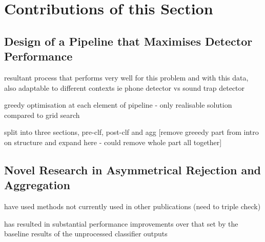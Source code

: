 \section{Contributions of this Section}
\label{sec:exp-overview}

    
    \subsection{Design of a Pipeline that Maximises Detector Performance}
    \label{subsec:exp-overview-detect}
        \begin{sitemize}
            \item{resultant process that performs very well for this problem and with this data, also adaptable to different contexts ie phone detector vs sound trap detector}
            \item{greedy optimisation at each element of pipeline - only realisable solution compared to grid search}
            \item{split into three sections, pre-clf, post-clf and agg [remove greeedy part from intro on structure and expand here - could remove whole part all together]}
        \end{sitemize}
    
    \subsection{Novel Research in Asymmetrical Rejection and Aggregation}
    \label{subsec:exp-overview-novel}
        \begin{sitemize}
            \item{have used methods not currently used in other publications (need to triple check)}
            \item{has resulted in substantial performance improvements over that set by the baseline results of the unprocessed classifier outputs}
        \end{sitemize}
    
  